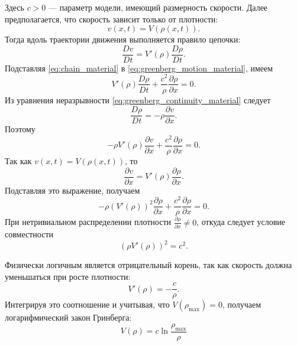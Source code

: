\documentclass[12pt,a4paper]{article}
\begin{document}
Здесь \(c>0\) --- параметр модели, имеющий размерность скорости. Далее предполагается, что скорость зависит только от плотности:
\[
v(x, t)=V(\rho(x, t)).
\]
Тогда вдоль траектории движения выполняется правило цепочки:
\begin{equation}
\frac{Dv}{Dt}=V'(\rho)\frac{D\rho}{Dt}.
\label{eq:chain_material}
\end{equation}
Подставляя \eqref{eq:chain_material} в \eqref{eq:greenberg_motion_material}, имеем
\[
V'(\rho)\frac{D\rho}{Dt}
+\frac{c^2}{\rho}\frac{\partial \rho}{\partial x}=0.
\]
Из уравнения неразрывности \eqref{eq:greenberg_continuity_material} следует
\[
\frac{D\rho}{Dt}=-\rho\frac{\partial v}{\partial x}.
\]
Поэтому
\[
-\rho V'(\rho)\frac{\partial v}{\partial x}
+\frac{c^2}{\rho}\frac{\partial \rho}{\partial x}=0.
\]
Так как \(v(x,t)=V(\rho(x,t))\), то
\[
\frac{\partial v}{\partial x}
=V'(\rho)\frac{\partial \rho}{\partial x}.
\]
Подставляя это выражение, получаем
\[
-\rho\left(V'(\rho)\right)^2\frac{\partial \rho}{\partial x}
+\frac{c^2}{\rho}\frac{\partial \rho}{\partial x}=0.
\]
При нетривиальном распределении плотности \(\frac{\partial \rho}{\partial x}\neq 0\), откуда следует условие совместности
\[
\left(\rho V'(\rho)\right)^2=c^2.
\]

Физически логичным является отрицательный корень, так как скорость должна уменьшаться при росте плотности:
\[
V'(\rho)=-\frac{c}{\rho}.
\]
Интегрируя это соотношение и учитывая, что $V(\rho_{\max})=0$, получаем логарифмический закон Гринберга:
\begin{equation}
\boxed{V(\rho)=c\ln\frac{\rho_{\max}}{\rho}}
\label{eq:greenberg_speed_density}
\end{equation}
\end{document}
